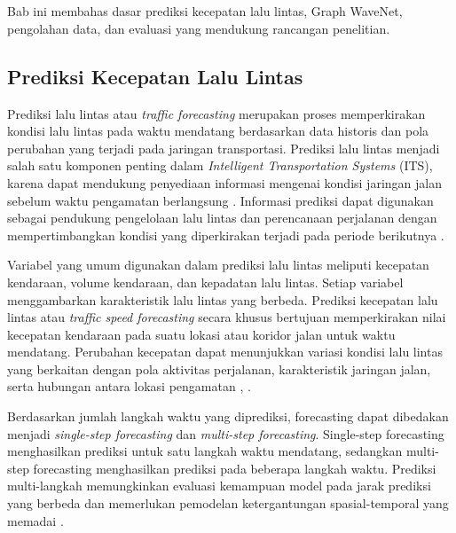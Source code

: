 \chapter{\babDua}
\label{cha:tinjauan_pustaka}

Bab ini membahas dasar prediksi kecepatan lalu lintas, Graph WaveNet, pengolahan data, dan evaluasi yang mendukung rancangan penelitian.

\section{Prediksi Kecepatan Lalu Lintas}
\label{sec:traffic_forecasting}

Prediksi lalu lintas atau \textit{traffic forecasting} merupakan proses memperkirakan kondisi lalu lintas pada waktu mendatang berdasarkan data historis dan pola perubahan yang terjadi pada jaringan transportasi. Prediksi lalu lintas menjadi salah satu komponen penting dalam \textit{Intelligent Transportation Systems} (ITS), karena dapat mendukung penyediaan informasi mengenai kondisi jaringan jalan sebelum waktu pengamatan berlangsung \cite{jiang2022gnntraffic}. Informasi prediksi dapat digunakan sebagai pendukung pengelolaan lalu lintas dan perencanaan perjalanan dengan mempertimbangkan kondisi yang diperkirakan terjadi pada periode berikutnya \cite{fusco2016comparative}.

Variabel yang umum digunakan dalam prediksi lalu lintas meliputi kecepatan kendaraan, volume kendaraan, dan kepadatan lalu lintas. Setiap variabel menggambarkan karakteristik lalu lintas yang berbeda. Prediksi kecepatan lalu lintas atau \textit{traffic speed forecasting} secara khusus bertujuan memperkirakan nilai kecepatan kendaraan pada suatu lokasi atau koridor jalan untuk waktu mendatang. Perubahan kecepatan dapat menunjukkan variasi kondisi lalu lintas yang berkaitan dengan pola aktivitas perjalanan, karakteristik jaringan jalan, serta hubungan antara lokasi pengamatan \cite{jiang2022gnntraffic}, \cite{zhang2019multistep}.

Berdasarkan jumlah langkah waktu yang diprediksi, forecasting dapat dibedakan menjadi \textit{single-step forecasting} dan \textit{multi-step forecasting}. Single-step forecasting menghasilkan prediksi untuk satu langkah waktu mendatang, sedangkan multi-step forecasting menghasilkan prediksi pada beberapa langkah waktu. Prediksi multi-langkah memungkinkan evaluasi kemampuan model pada jarak prediksi yang berbeda dan memerlukan pemodelan ketergantungan spasial-temporal yang memadai \cite{zhang2019multistep}.

